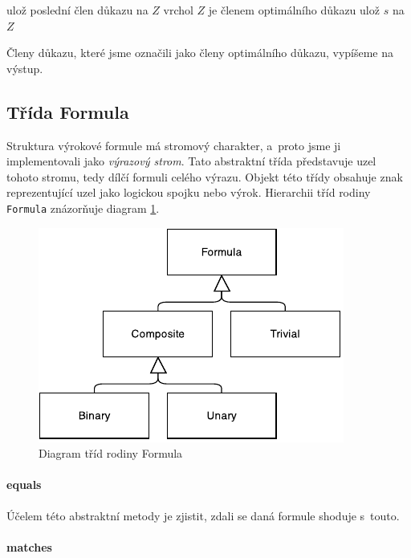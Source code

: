 \documentclass[thesis=B,czech,hidelinks]{thesis}[2012/06/26]
\begin{document}
\begin{algorithm}
ulož poslední člen důkazu na $Z$\;
{
	vrchol $Z$ je členem optimálního důkazu\;
	{
		ulož $s$ na $Z$\;
	}
}
\end{algorithm}

Členy důkazu, které jsme označili jako členy optimálního důkazu, vypíšeme na výstup.

\subsection{Třída Formula}

Struktura výrokové formule má stromový charakter, a~proto jsme ji implementovali jako \emph{výrazový strom}. Tato abstraktní třída představuje uzel tohoto stromu, tedy dílčí formuli celého výrazu. Objekt této třídy obsahuje znak reprezentující uzel jako logickou spojku nebo výrok. Hierarchii tříd rodiny \texttt{Formula} znázorňuje diagram \ref{fig:formula}.

\begin{figure}
\centering
\caption{Diagram tříd rodiny Formula}
\label{fig:formula}
\includegraphics{diagrams/formula}
\end{figure}

\paragraph{equals}

Účelem této abstraktní metody je zjistit, zdali se daná formule shoduje s~touto.

\paragraph{matches}
\end{document}
